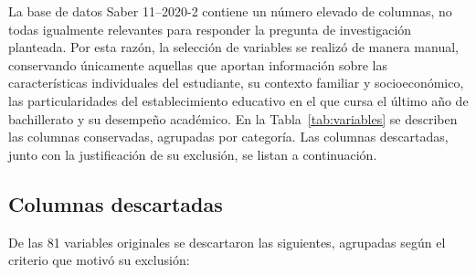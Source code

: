 \documentclass[12pt]{article}
\begin{document}
La base de datos Saber 11--2020-2 contiene un número elevado de columnas, no todas igualmente relevantes para responder la pregunta de investigación planteada. Por esta razón, la selección de variables se realizó de manera manual, conservando únicamente aquellas que aportan información sobre las características individuales del estudiante, su contexto familiar y socioeconómico, las particularidades del establecimiento educativo en el que cursa el último año de bachillerato y su desempeño académico. En la Tabla~\ref{tab:variables} se describen las columnas conservadas, agrupadas por categoría. Las columnas descartadas, junto con la justificación de su exclusión, se listan a continuación.

\subsection{Columnas descartadas}

De las 81 variables originales se descartaron las siguientes, agrupadas
según el criterio que motivó su exclusión:
\end{document}
